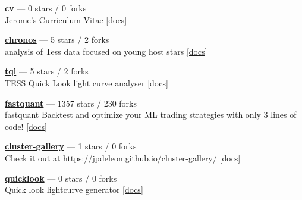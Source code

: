 \item \href{https://github.com/jpdeleon/cv}{{\bf cv}} --- 0 stars / 0 forks \\
Jerome's Curriculum Vitae \href{https://raw.githubusercontent.com/jpdeleon/cv/main-pdf/tex/cv_pubs.pdf}{[docs]}

\item \href{https://github.com/jpdeleon/chronos}{{\bf chronos}} --- 5 stars / 2 forks \\
analysis of Tess data focused on young host stars \href{None}{[docs]}

\item \href{https://github.com/jpdeleon/tql}{{\bf tql}} --- 5 stars / 2 forks \\
TESS Quick Look light curve analyser \href{None}{[docs]}

\item \href{https://github.com/enzoampil/fastquant}{{\bf fastquant}} --- 1357 stars / 230 forks \\
fastquant {\textemdash} Backtest and optimize your ML trading strategies with only 3 lines of code! \href{}{[docs]}

\item \href{https://github.com/jpdeleon/cluster-gallery}{{\bf cluster-gallery}} --- 1 stars / 0 forks \\
Check it out at https://jpdeleon.github.io/cluster-gallery/ \href{None}{[docs]}

\item \href{https://github.com/jpdeleon/quicklook}{{\bf quicklook}} --- 0 stars / 0 forks \\
Quick look lightcurve generator \href{None}{[docs]}